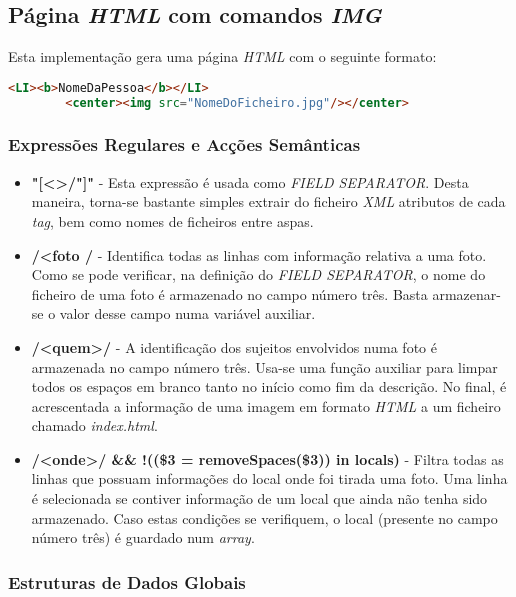 \documentclass{article}
\begin{document}
\subsection{Página \emph{HTML} com comandos \emph{IMG}}

Esta implementação gera uma página \emph{HTML} com o seguinte formato:

\begin{lstlisting}[language=html]
    <LI><b>NomeDaPessoa</b></LI>
        <center><img src="NomeDoFicheiro.jpg"/></center>
\end{lstlisting}


\subsubsection{Expressões Regulares e Acções Semânticas}

\begin{itemize}
    \item \textbf{"[\textless\textgreater/"]"} - Esta expressão é usada como \emph{FIELD SEPARATOR}. Desta maneira, torna-se bastante simples extrair do ficheiro \emph{XML} atributos de cada \emph{tag}, bem como nomes de ficheiros entre aspas. 
    \item \textbf{/\textless foto / } - Identifica todas as linhas com informação relativa a uma foto. Como se pode verificar, na definição do \emph{FIELD SEPARATOR}, o nome do ficheiro de uma foto é armazenado no campo número três. Basta armazenar-se o valor desse campo numa variável auxiliar.
    \item \textbf{/\textless quem\textgreater/} - A identificação dos sujeitos envolvidos numa foto é armazenada no campo número três. Usa-se uma função auxiliar para limpar todos os espaços em branco tanto no início como fim da descrição. No final, é acrescentada a informação de uma imagem em formato \emph{HTML} a um ficheiro chamado \emph{index.html}.
    \item \textbf{/\textless onde\textgreater/ && !((\$3 = removeSpaces(\$3)) in locals)} - Filtra todas as linhas que possuam informações do local onde foi tirada uma foto. Uma linha é selecionada se contiver informação de um local que ainda não tenha sido armazenado. Caso estas condições se verifiquem, o local (presente no campo número três) é guardado num \emph{array}. 
\end{itemize}


\subsubsection{Estruturas de Dados Globais}
\end{document}
